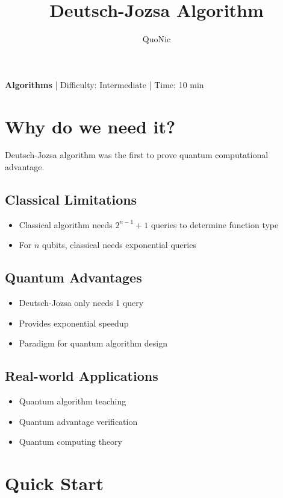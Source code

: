 \documentclass[12pt,a4paper]{article}
\title{Deutsch-Jozsa Algorithm}
\author{QuoNic}
\date{}
\begin{document}
\maketitle

\begin{center}
\textbf{Algorithms} | Difficulty: Intermediate | Time: 10 min
\end{center}

\tableofcontents
\newpage

\section{Why do we need it?}

Deutsch-Jozsa algorithm was the first to prove quantum computational advantage.

\subsection{Classical Limitations}
\begin{itemize}
  \item Classical algorithm needs $2^{n-1}+1$ queries to determine function type
  \item For $n$ qubits, classical needs exponential queries
\end{itemize}

\subsection{Quantum Advantages}
\begin{itemize}
  \item Deutsch-Jozsa only needs 1 query
  \item Provides exponential speedup
  \item Paradigm for quantum algorithm design
\end{itemize}

\subsection{Real-world Applications}
\begin{itemize}
  \item Quantum algorithm teaching
  \item Quantum advantage verification
  \item Quantum computing theory
\end{itemize}

\section{Quick Start}
\end{document}
